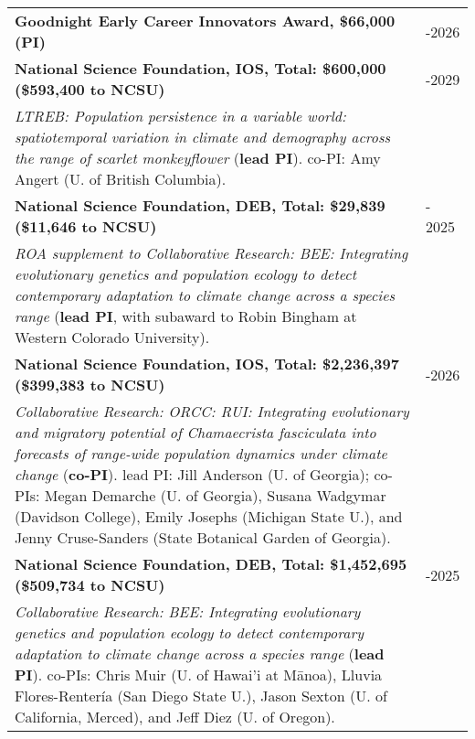 \documentclass[11pt,english]{article}\usepackage[]{graphicx}\usepackage[]{xcolor}
\providecommand{\tabularnewline}{\\}
\begin{document}
\renewcommand{\arraystretch}{1.2}
\begin{tabularx}{\textwidth}{@{}>{\raggedright}p{5.25in} >{\raggedleft}X@{}}

\textbf{{Goodnight Early Career Innovators Award, \$66,000 (PI)}} & 2023-2026 \tabularnewline

\small \textbf{{National Science Foundation, IOS, Total: \$600,000} (\$593,400 to NCSU)} & 2024-2029 \tabularnewline
\addtolength{\leftskip}{5ex}\emph{LTREB: Population persistence in a variable world: spatiotemporal variation in climate and demography across the range of scarlet monkeyflower} (\textbf{lead PI}). \small{co-PI: Amy Angert (U. of British Columbia).} \tabularnewline

\small \textbf{{National Science Foundation, DEB, Total: \$29,839} (\$11,646 to NCSU)} & 2023 - 2025 \tabularnewline
\addtolength{\leftskip}{5ex}\emph{ROA supplement to Collaborative Research: BEE: Integrating evolutionary genetics and population ecology to detect contemporary adaptation to climate change across a species range} (\textbf{lead PI}, with subaward to Robin Bingham at Western Colorado University).  \tabularnewline

\small \textbf{{National Science Foundation, IOS, Total: \$2,236,397} (\$399,383 to NCSU)} & 2023-2026 \tabularnewline
\addtolength{\leftskip}{5ex}\emph{Collaborative Research: ORCC: RUI: Integrating evolutionary and migratory potential of Chamaecrista fasciculata into forecasts of range-wide population dynamics under climate change} (\textbf{co-PI}). \small{lead PI: Jill Anderson (U. of Georgia); co-PIs: Megan Demarche (U. of Georgia), Susana Wadgymar (Davidson College), Emily Josephs (Michigan State U.), and Jenny Cruse-Sanders (State Botanical Garden of Georgia).} \tabularnewline

\small \textbf{{National Science Foundation, DEB, Total: \$1,452,695} (\$509,734 to NCSU)} & 2022-2025 \tabularnewline
\addtolength{\leftskip}{5ex}\emph{Collaborative Research: BEE: Integrating evolutionary genetics and population ecology to detect contemporary adaptation to climate change across a species range} (\textbf{lead PI}). \small{co-PIs: Chris Muir (U. of Hawai'i at M\={a}noa), Lluvia Flores-Renter\'{i}a (San Diego State U.), Jason Sexton (U. of California, Merced), and Jeff Diez (U. of Oregon).} \tabularnewline

\end{tabularx}
\end{document}
